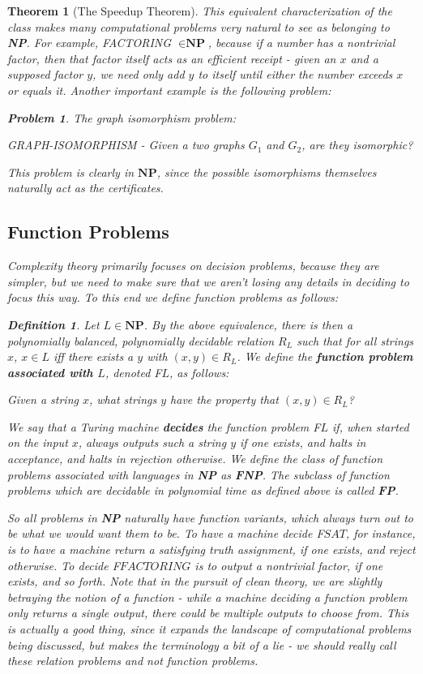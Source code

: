 \documentclass{article}
\theoremstyle{definition}
\newtheorem{definition}{Definition}[section]
\newtheorem{problem}{Problem}
\theoremstyle{plain}
\theoremstyle{theorem}
\newtheorem{theorem}{Theorem}[section]
\begin{document}
\begin{theorem}[The Speedup Theorem]
This equivalent characterization of the class makes many computational problems very natural to see as belonging to \textbf{NP}. For example, FACTORING $\in \textbf{NP}$, because if a number has a nontrivial factor, then that factor itself acts as an efficient receipt - given an $x$ and a supposed factor $y$, we need only add $y$ to itself until either the number exceeds $x$ or equals it. Another important example is the following problem:
\begin{problem}
    The graph isomorphism problem:
    \begin{center}
        GRAPH-ISOMORPHISM - Given a two graphs $G_1$ and $G_2$, are they isomorphic?
    \end{center}
\end{problem}
This problem is clearly in $\textbf{NP}$, since the possible isomorphisms themselves naturally act as the certificates. 
\subsection{Function Problems}
\par Complexity theory primarily focuses on decision problems, because they are simpler, but we need to make sure that we aren't losing any details in deciding to focus this way. To this end we define function problems as follows:
\begin{definition}
    Let $L \in \textbf{NP}$. By the above equivalence, there is then a polynomially balanced, polynomially decidable relation $R_L$ such that for all strings $x$, $x \in L$ iff there exists a $y$ with $(x,y) \in R_L$. We define the \textbf{function problem associated with $L$}, denoted F$L$, as follows:
    \begin{center}
        Given a string $x$, what strings $y$ have the property that $(x,y) \in R_L$?
    \end{center}
    We say that a Turing machine \textbf{decides} the function problem F$L$ if, when started on the input $x$, always outputs such a string $y$ if one exists, and halts in acceptance, and halts in rejection otherwise. We define the class of function problems associated with languages in \textbf{NP} as \textbf{FNP}. The subclass of function problems which are decidable in polynomial time as defined above is called \textbf{FP}.
\end{definition}
So all problems in \textbf{NP} naturally have function variants, which always turn out to be what we would want them to be. To have a machine decide F$SAT$, for instance, is to have a machine return a satisfying truth assignment, if one exists, and reject otherwise. To decide F$FACTORING$ is to output a nontrivial factor, if one exists, and so forth. Note that in the pursuit of clean theory, we are slightly betraying the notion of a function - while a machine deciding a function problem only returns a single output, there could be multiple outputs to choose from. This is actually a good thing, since it expands the landscape of computational problems being discussed, but makes the terminology a bit of a lie - we should really call these relation problems and not function problems.

\end{theorem}
\end{document}
